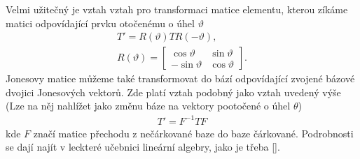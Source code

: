 Velmi užitečný je vztah vztah pro transformaci matice elementu, kterou zíkáme matici odpovídající prvku otočenému o úhel $\vartheta$
\begin{eqnarray}
T'=R(\vartheta)TR(-\vartheta), \\
R(\vartheta) = \begin{bmatrix} \cos\vartheta & \sin\vartheta \\ -\sin\vartheta & \cos\vartheta \end{bmatrix}.
\end{eqnarray}
Jonesovy matice můžeme také transformovat do bází odpovídající zvojené bázové dvojici Jonesových vektorů. Zde platí vztah podobný jako vztah uvedený výše (Lze na něj nahlížet jako změnu báze na vektory pootočené o úhel $\theta$)
\begin{eqnarray}
T'=F^{-1}TF
\end{eqnarray}
kde $F$ značí matice přechodu z nečárkované baze do baze čárkované. Podrobnosti se dají najít v leckteré učebnici lineární algebry, jako je třeba [\cite{Smid}].

